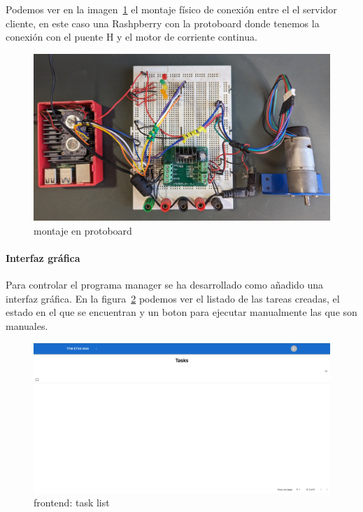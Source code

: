 Podemos ver en la imagen~\cref{fig:montaje en protoboard} el montaje físico de conexión entre el el servidor cliente, en este caso una Rashpberry con la protoboard donde tenemos la conexión con el puente H y el motor de corriente continua.

\begin{figure}[H]
    \centering
    \includegraphics[height=0.2\textheight]{./part/Ejecucion/Seguimiento/PuestaAPunto/img/montajeProtoboard}
    \caption{montaje en protoboard}\label{fig:montaje en protoboard}
\end{figure}

\paragraph{Interfaz gráfica}\label{par:interfaz}

Para controlar el programa manager se ha desarrollado como añadido una interfaz gráfica. En la figura~\cref{fig:frontend} podemos ver el listado de las tareas creadas, el estado en el que se encuentran y un boton para ejecutar manualmente las que son manuales.

\begin{figure}[H]
    \centering
    \includegraphics[height=0.2\textheight]{./part/Ejecucion/Seguimiento/PuestaAPunto/img/frontend}
    \caption{frontend: task list}\label{fig:frontend}
\end{figure}

